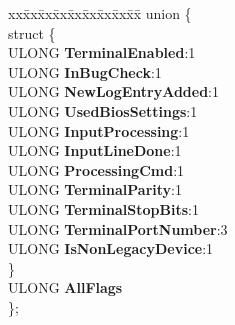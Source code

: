 \begin{DoxyCompactItemize}
\item 
\mbox{\label{struct___h_e_a_d_l_e_s_s___g_l_o_b_a_l_s_ae641d00fe9f0d7fb9ea6e5099a32b926}} 
\begin{tabbing}
xx\=xx\=xx\=xx\=xx\=xx\=xx\=xx\=xx\=\kill
union \{\\
\mbox{\label{union___h_e_a_d_l_e_s_s___g_l_o_b_a_l_s_1_1_0D1424_a3fa0391829d7e2c660736cf891156819}} 
\>struct \{\\
\>\>ULONG {\bfseries TerminalEnabled}:1\\
\>\>ULONG {\bfseries InBugCheck}:1\\
\>\>ULONG {\bfseries NewLogEntryAdded}:1\\
\>\>ULONG {\bfseries UsedBiosSettings}:1\\
\>\>ULONG {\bfseries InputProcessing}:1\\
\>\>ULONG {\bfseries InputLineDone}:1\\
\>\>ULONG {\bfseries ProcessingCmd}:1\\
\>\>ULONG {\bfseries TerminalParity}:1\\
\>\>ULONG {\bfseries TerminalStopBits}:1\\
\>\>ULONG {\bfseries TerminalPortNumber}:3\\
\>\>ULONG {\bfseries IsNonLegacyDevice}:1\\
\>\} \\
\>ULONG {\bfseries AllFlags}\\
\}; \\


\end{tabbing}
\end{DoxyCompactItemize}
